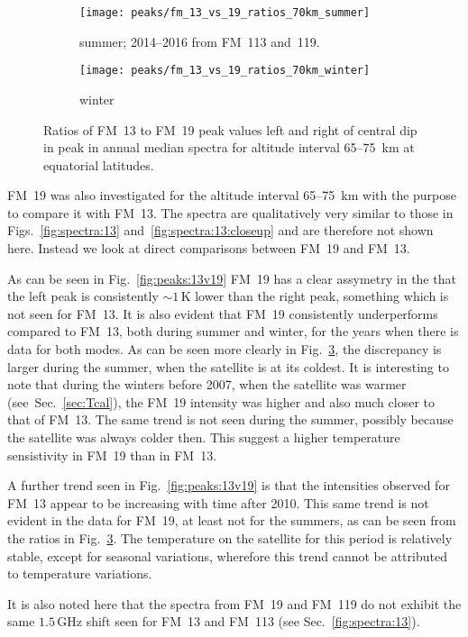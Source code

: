 \begin{figure}[ht]
    \centering
    \begin{subfigure}[b]{0.9545\textwidth}
        \texttt{[image: peaks/fm\_13\_vs\_19\_ratios\_70km\_summer]}
        \caption{summer; 2014--2016 from FM~113 and~119.
            }\label{fig:ratios:13v19:summer}
    \end{subfigure}
    \begin{subfigure}[b]{0.9545\textwidth}
        \texttt{[image: peaks/fm\_13\_vs\_19\_ratios\_70km\_winter]}
        \caption{winter}\label{fig:ratios:13v19:winter}
    \end{subfigure}
    \caption{Ratios of FM~13 to FM~19 peak values left and right of central dip
        in  peak in annual median spectra for altitude interval
        65--75~km at equatorial latitudes.
    }\label{fig:ratios:13v19}
\end{figure}

\noindent
FM~19 was also investigated for the altitude interval 65--75~km with the
purpose to compare it with FM~13.  The spectra are qualitatively very similar to
those in Figs.~\ref{fig:spectra:13} and~\ref{fig:spectra:13:closeup} and are
therefore not shown here.  Instead we look at direct comparisons between FM~19
and FM~13.

As can be seen in Fig.~\ref{fig:peaks:13v19} FM~19 has a clear assymetry in the
that the left peak is consistently $\sim1\,\mathrm{K}$ lower than the right
peak, something which is not seen for FM~13.  It is also evident that FM~19
consistently underperforms compared to FM~13, both during summer and winter,
for the years when there is data for both modes.  As can be seen more clearly
in Fig.~\ref{fig:ratios:13v19}, the discrepancy is larger during the summer,
when the satellite is at its coldest.  It is interesting to note that during
the winters before 2007, when the satellite was warmer
(see~Sec.~\ref{sec:Tcal}), the FM~19 intensity was higher and also much closer
to that of FM~13.  The same trend is not seen during the summer, possibly
because the satellite was always colder then.  This suggest a higher
temperature sensistivity in FM~19 than in FM~13.

A further trend seen in Fig.~\ref{fig:peaks:13v19} is that the intensities
observed for FM~13 appear to be increasing with time after 2010.  This same
trend is not evident in the data for FM~19, at least not for the summers, as
can be seen from the ratios in Fig.~\ref{fig:ratios:13v19}.  The temperature on
the satellite for this period is relatively stable, except for seasonal
variations, wherefore this trend cannot be attributed to temperature
variations.

It is also noted here that the spectra from FM~19 and FM~119 do not exhibit the
same $1.5\,\mathrm{GHz}$ shift seen for FM~13 and FM~113 (see
Sec.~\ref{fig:spectra:13}).
